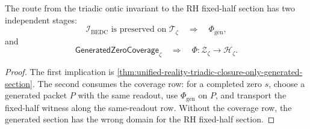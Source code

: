 \begin{corollary}
\label{cor:unified-reality-full-rh-requires-coverage-after-invariant}
The route from the triadic ontic invariant to the RH fixed-half section
has two independent stages:
$$
\mathcal I_{\mathrm{BEDC}}\text{ is preserved on }\mathcal T_{\zeta}
\quad\Longrightarrow\quad
\Phi_{\mathrm{gen}},
$$
and
$$
\mathsf{GeneratedZeroCoverage}_{\zeta}
\quad\Longrightarrow\quad
\Phi:\mathcal Z_{\zeta}\to\mathcal H_{\zeta}.
$$
\end{corollary}

\begin{proof}
The first implication is
\autoref{thm:unified-reality-triadic-closure-only-generated-section}.
The second consumes the coverage row: for a completed zero $s$, choose a
generated packet $P$ with the same readout, use $\Phi_{\mathrm{gen}}$ on
$P$, and transport the fixed-half witness along the same-readout row.
Without the coverage row, the generated section has the wrong domain for
the RH fixed-half section.
\end{proof}
